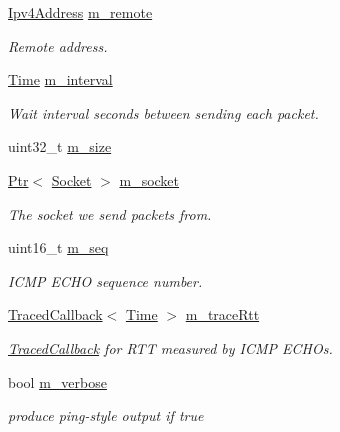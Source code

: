 \begin{DoxyCompactItemize}
\item 
\hyperlink{classns3_1_1Ipv4Address}{Ipv4\+Address} \hyperlink{classns3_1_1V4Ping_a30b2005deccba89dc440a120853864f2}{m\+\_\+remote}
\begin{DoxyCompactList}\small\item\em Remote address. \end{DoxyCompactList}\item 
\hyperlink{classns3_1_1Time}{Time} \hyperlink{classns3_1_1V4Ping_af709274c8ed4f886a1710d49c28bd5ea}{m\+\_\+interval}
\begin{DoxyCompactList}\small\item\em Wait interval seconds between sending each packet. \end{DoxyCompactList}\item 
uint32\+\_\+t \hyperlink{classns3_1_1V4Ping_a15214114a8580f6e7c56ad18267b2199}{m\+\_\+size}
\item 
\hyperlink{classns3_1_1Ptr}{Ptr}$<$ \hyperlink{classns3_1_1Socket}{Socket} $>$ \hyperlink{classns3_1_1V4Ping_a1f778736aaa1d07de9bb66375f20942f}{m\+\_\+socket}
\begin{DoxyCompactList}\small\item\em The socket we send packets from. \end{DoxyCompactList}\item 
uint16\+\_\+t \hyperlink{classns3_1_1V4Ping_a6575afe89682fff8b490075425d8157e}{m\+\_\+seq}
\begin{DoxyCompactList}\small\item\em I\+C\+MP E\+C\+HO sequence number. \end{DoxyCompactList}\item 
\hyperlink{classns3_1_1TracedCallback}{Traced\+Callback}$<$ \hyperlink{classns3_1_1Time}{Time} $>$ \hyperlink{classns3_1_1V4Ping_abaf5eec819058e81e958ae3dadb8fbe2}{m\+\_\+trace\+Rtt}
\begin{DoxyCompactList}\small\item\em \hyperlink{classns3_1_1TracedCallback}{Traced\+Callback} for R\+TT measured by I\+C\+MP E\+C\+H\+Os. \end{DoxyCompactList}\item 
bool \hyperlink{classns3_1_1V4Ping_a0b843e4454492e5a20860b6c624b667b}{m\+\_\+verbose}
\begin{DoxyCompactList}\small\item\em produce ping-\/style output if true \end{DoxyCompactList}\item 

\end{DoxyCompactItemize}
